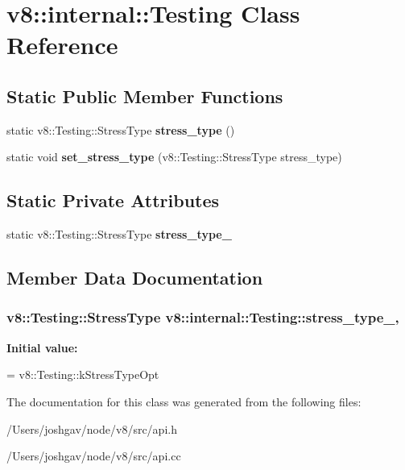 \hypertarget{classv8_1_1internal_1_1_testing}{}\section{v8\+:\+:internal\+:\+:Testing Class Reference}
\label{classv8_1_1internal_1_1_testing}
\subsection*{Static Public Member Functions}
\begin{DoxyCompactItemize}
\item 
static v8\+::\+Testing\+::\+Stress\+Type {\bfseries stress\+\_\+type} ()\hypertarget{classv8_1_1internal_1_1_testing_aac7227aab90d2429d7c31028287c54fe}{}\label{classv8_1_1internal_1_1_testing_aac7227aab90d2429d7c31028287c54fe}

\item 
static void {\bfseries set\+\_\+stress\+\_\+type} (v8\+::\+Testing\+::\+Stress\+Type stress\+\_\+type)\hypertarget{classv8_1_1internal_1_1_testing_a5416ca263ee9b94dc271e6365185fb5c}{}\label{classv8_1_1internal_1_1_testing_a5416ca263ee9b94dc271e6365185fb5c}

\end{DoxyCompactItemize}
\subsection*{Static Private Attributes}
\begin{DoxyCompactItemize}
\item 
static v8\+::\+Testing\+::\+Stress\+Type {\bfseries stress\+\_\+type\+\_\+}
\end{DoxyCompactItemize}


\subsection{Member Data Documentation}
\subsubsection[{\texorpdfstring{stress\+\_\+type\+\_\+}{stress_type_}}]{\setlength{\rightskip}{0pt plus 5cm}v8\+::\+Testing\+::\+Stress\+Type v8\+::internal\+::\+Testing\+::stress\+\_\+type\+\_\+\hspace{0.3cm}{\ttfamily [static]}, {\ttfamily [private]}}\hypertarget{classv8_1_1internal_1_1_testing_adac7fd0dd3436096616d4add504ea2d7}{}\label{classv8_1_1internal_1_1_testing_adac7fd0dd3436096616d4add504ea2d7}
{\bfseries Initial value\+:}
\begin{DoxyCode}
=
    v8::Testing::kStressTypeOpt
\end{DoxyCode}


The documentation for this class was generated from the following files\+:\begin{DoxyCompactItemize}
\item 
/\+Users/joshgav/node/v8/src/api.\+h\item 
/\+Users/joshgav/node/v8/src/api.\+cc\end{DoxyCompactItemize}
